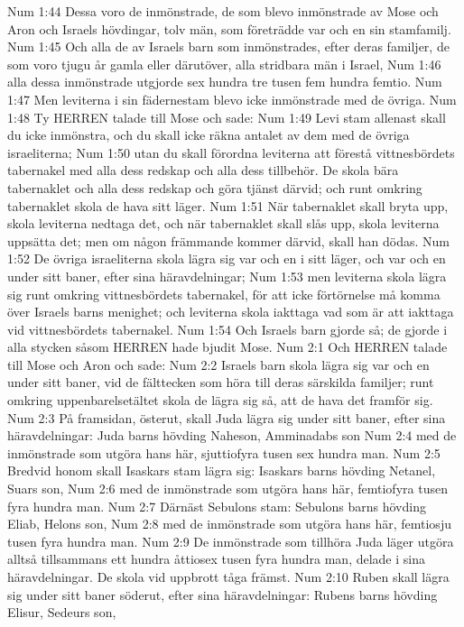 Num 1:44  Dessa voro de inmönstrade, de som blevo inmönstrade av Mose och Aron och Israels hövdingar, tolv män, som företrädde var och en sin stamfamilj.
Num 1:45  Och alla de av Israels barn som inmönstrades, efter deras familjer, de som voro tjugu år gamla eller därutöver, alla stridbara män i Israel,
Num 1:46  alla dessa inmönstrade utgjorde sex hundra tre tusen fem hundra femtio.
Num 1:47  Men leviterna i sin fädernestam blevo icke inmönstrade med de övriga.
Num 1:48  Ty HERREN talade till Mose och sade:
Num 1:49  Levi stam allenast skall du icke inmönstra, och du skall icke räkna antalet av dem med de övriga israeliterna;
Num 1:50  utan du skall förordna leviterna att förestå vittnesbördets tabernakel med alla dess redskap och alla dess tillbehör. De skola bära tabernaklet och alla dess redskap och göra tjänst därvid; och runt omkring tabernaklet skola de hava sitt läger.
Num 1:51  När tabernaklet skall bryta upp, skola leviterna nedtaga det, och när tabernaklet skall slås upp, skola leviterna uppsätta det; men om någon främmande kommer därvid, skall han dödas.
Num 1:52  De övriga israeliterna skola lägra sig var och en i sitt läger, och var och en under sitt baner, efter sina häravdelningar;
Num 1:53  men leviterna skola lägra sig runt omkring vittnesbördets tabernakel, för att icke förtörnelse må komma över Israels barns menighet; och leviterna skola iakttaga vad som är att iakttaga vid vittnesbördets tabernakel.
Num 1:54  Och Israels barn gjorde så; de gjorde i alla stycken såsom HERREN hade bjudit Mose.
Num 2:1  Och HERREN talade till Mose och Aron och sade:
Num 2:2  Israels barn skola lägra sig var och en under sitt baner, vid de fälttecken som höra till deras särskilda familjer; runt omkring uppenbarelsetältet skola de lägra sig så, att de hava det framför sig.
Num 2:3  På framsidan, österut, skall Juda lägra sig under sitt baner, efter sina häravdelningar: Juda barns hövding Naheson, Amminadabs son
Num 2:4  med de inmönstrade som utgöra hans här, sjuttiofyra tusen sex hundra man.
Num 2:5  Bredvid honom skall Isaskars stam lägra sig: Isaskars barns hövding Netanel, Suars son,
Num 2:6  med de inmönstrade som utgöra hans här, femtiofyra tusen fyra hundra man.
Num 2:7  Därnäst Sebulons stam: Sebulons barns hövding Eliab, Helons son,
Num 2:8  med de inmönstrade som utgöra hans här, femtiosju tusen fyra hundra man.
Num 2:9  De inmönstrade som tillhöra Juda läger utgöra alltså tillsammans ett hundra åttiosex tusen fyra hundra man, delade i sina häravdelningar. De skola vid uppbrott tåga främst.
Num 2:10  Ruben skall lägra sig under sitt baner söderut, efter sina häravdelningar: Rubens barns hövding Elisur, Sedeurs son,
